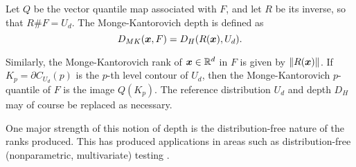 \begin{definition}
    Let $Q$ be the vector quantile map associated with $F$, and let $R$ be its
    inverse, so that $R\#F = U_d$.
    The Monge-Kantorovich depth is defined as
    \begin{equation}
        D_{MK}(\bm{x}, F) = D_H(R(\bm{x}), U_d).
    \end{equation}
\end{definition}

Similarly, the Monge-Kantorovich rank of $\bm{x} \in \mathbb{R}^d$ in $F$ is given by
$\Vert R(\bm{x}) \Vert$.
If $K_p = \partial C_{U_d}(p)$ is the $p$-th level contour of $U_d$, then the
Monge-Kantorovich $p$-quantile of $F$ is the image $Q(K_p)$.
The reference distribution $U_d$ and depth $D_H$ may of course be replaced as
necessary.

One major strength of this notion of depth is the distribution-free nature of
the ranks produced.
This has produced applications in areas such as distribution-free
(nonparametric, multivariate) testing \parencite{ghosal-sen-2022,
deb-sen-2023}.
